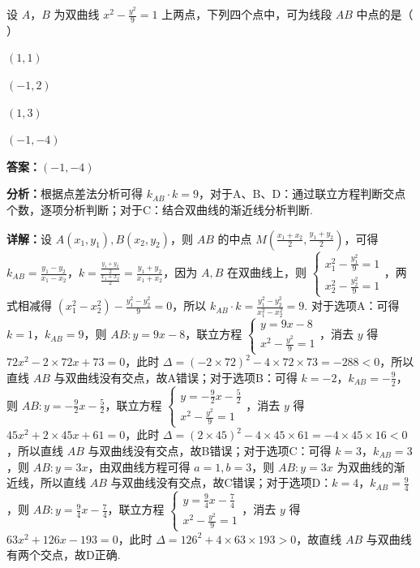 \begin{question}[points=5]
设 $A$，$B$ 为双曲线 $x^2-\frac{y^2}{9}=1$ 上两点，下列四个点中，可为线段 $AB$ 中点的是（ ）
\begin{choices}
  \item $(1,1)$
  \item $(-1,2)$
  \item $(1,3)$
  \item $(-1,-4)$
\end{choices}
\begin{solution}
\textbf{答案：}$(-1,-4)$

\textbf{分析：}根据点差法分析可得 $k_{AB}\cdot k=9$，对于A、B、D：通过联立方程判断交点个数，逐项分析判断；对于C：结合双曲线的渐近线分析判断.

\textbf{详解：}设 $A(x_1,y_1),B(x_2,y_2)$，则 $AB$ 的中点 $M(\frac{x_1+x_2}{2},\frac{y_1+y_2}{2})$，可得 $k_{AB}=\frac{y_1-y_2}{x_1-x_2}$，$k=\frac{\frac{y_1+y_2}{2}}{\frac{x_1+x_2}{2}}=\frac{y_1+y_2}{x_1+x_2}$，因为 $A,B$ 在双曲线上，则 $\begin{cases} x_1^2-\frac{y_1^2}{9}=1 \\ x_2^2-\frac{y_2^2}{9}=1 \end{cases}$，两式相减得 $(x_1^2-x_2^2)-\frac{y_1^2-y_2^2}{9}=0$，所以 $k_{AB}\cdot k=\frac{y_1^2-y_2^2}{x_1^2-x_2^2}=9$. 对于选项A：可得 $k=1$，$k_{AB}=9$，则 $AB:y=9x-8$，联立方程 $\begin{cases} y=9x-8 \\ x^2-\frac{y^2}{9}=1 \end{cases}$，消去 $y$ 得 $72x^2-2\times72x+73=0$，此时 $\Delta=(-2\times72)^2-4\times72\times73=-288<0$，所以直线 $AB$ 与双曲线没有交点，故A错误；对于选项B：可得 $k=-2$，$k_{AB}=-\frac{9}{2}$，则 $AB:y=-\frac{9}{2}x-\frac{5}{2}$，联立方程 $\begin{cases} y=-\frac{9}{2}x-\frac{5}{2} \\ x^2-\frac{y^2}{9}=1 \end{cases}$，消去 $y$ 得 $45x^2+2\times45x+61=0$，此时 $\Delta=(2\times45)^2-4\times45\times61=-4\times45\times16<0$，所以直线 $AB$ 与双曲线没有交点，故B错误；对于选项C：可得 $k=3$，$k_{AB}=3$，则 $AB:y=3x$，由双曲线方程可得 $a=1,b=3$，则 $AB:y=3x$ 为双曲线的渐近线，所以直线 $AB$ 与双曲线没有交点，故C错误；对于选项D：$k=4$，$k_{AB}=\frac{9}{4}$，则 $AB:y=\frac{9}{4}x-\frac{7}{4}$，联立方程 $\begin{cases} y=\frac{9}{4}x-\frac{7}{4} \\ x^2-\frac{y^2}{9}=1 \end{cases}$，消去 $y$ 得 $63x^2+126x-193=0$，此时 $\Delta=126^2+4\times63\times193>0$，故直线 $AB$ 与双曲线有两个交点，故D正确.
\end{solution}
\end{question}

